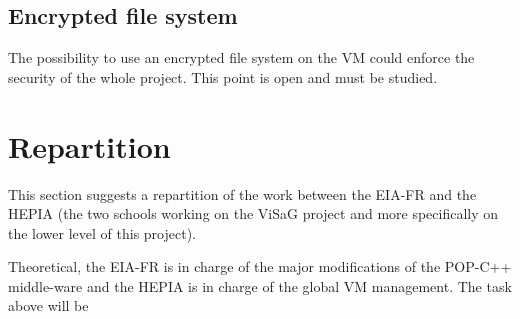 \subsection{Encrypted file system}
The possibility to use an encrypted file system on the VM could enforce the security of the whole project. This point is open and must be studied. 

\pagebreak
\section{Repartition}
\label{sec:repartition}
This section suggests a repartition of the work between the EIA-FR and the HEPIA (the two schools working on the ViSaG project and more specifically on the lower level of this project).\s

Theoretical, the EIA-FR is in charge of the major modifications of the POP-C++ middle-ware and the HEPIA is in charge of the global VM management. The task above will be 


